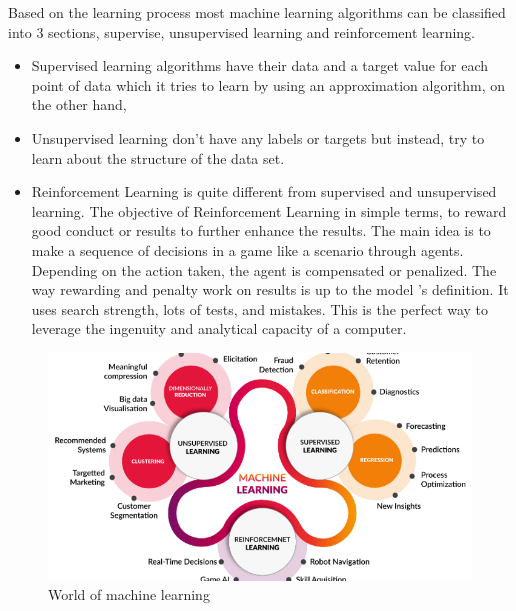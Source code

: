 Based on the learning process most machine learning algorithms can be classified into 3 sections, supervise, unsupervised learning and reinforcement learning.
\begin{itemize}
\item Supervised learning algorithms have their data and a target value for each point of data which it tries to learn by using an approximation algorithm, on the other hand, 
\item Unsupervised learning don’t have any labels or targets but instead, try to learn about the structure of the data set.
\item Reinforcement Learning is quite different from supervised and unsupervised learning. The objective of Reinforcement Learning in simple terms, to reward good conduct or results to further enhance the results. The main idea is to make a sequence of decisions in a game like a scenario through agents. Depending on the action taken, the agent is compensated or penalized. The way rewarding and penalty work on results is up to the model 's definition. It uses search strength, lots of tests, and mistakes. This is the perfect way to leverage the ingenuity and analytical capacity of a computer.
\end{itemize}


\begin{figure}[h]
  \centering
    \includegraphics[width=\linewidth]{figures/mlWorld.png}
    \caption{ World of machine learning }
\label{fig:mlWorld}
\end{figure}



